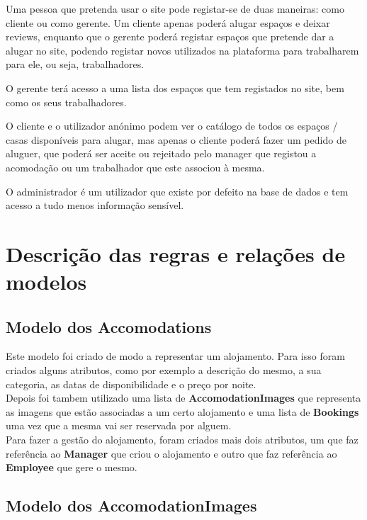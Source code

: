 \documentclass[11pt]{article}
\begin{document}
    Uma pessoa que pretenda usar o site pode registar-se de duas maneiras: como cliente ou como gerente. Um cliente apenas poderá alugar espaços e deixar reviews, enquanto que o gerente poderá registar espaços que pretende dar a alugar no site, podendo registar novos utilizados na plataforma para trabalharem para ele, ou seja, trabalhadores.
    
    O gerente terá acesso a uma lista dos espaços que tem registados no site, bem como os seus trabalhadores.
    
    O cliente e o utilizador anónimo podem ver o catálogo de todos os espaços / casas disponíveis para alugar, mas apenas o cliente poderá fazer um pedido de aluguer, que poderá ser aceite ou rejeitado pelo manager que registou a acomodação ou um trabalhador que este associou à mesma.
    
    O administrador é um utilizador que existe por defeito na base de dados e tem acesso a tudo menos informação sensível.
    

    \large
    \section{Descrição das regras e relações de modelos}
    \normalsize


    \subsection{Modelo dos Accomodations}
    \normalsize
    
    Este modelo foi criado de modo a representar um alojamento. Para isso foram criados alguns atributos, como por exemplo a descrição do mesmo, a sua categoria, as datas de disponibilidade e o preço por noite.\\
    Depois foi tambem utilizado uma lista de \textbf{AccomodationImages} que representa as imagens que estão associadas a um certo alojamento e uma lista de \textbf{Bookings} uma vez que a mesma vai ser reservada por alguem.\\
    Para fazer a gestão do alojamento, foram criados mais dois atributos, um que faz referência ao \textbf{Manager} que criou o alojamento e outro que faz referência ao \textbf{Employee} que gere o mesmo.
    
    
    \subsection{Modelo dos AccomodationImages}
    \normalsize
    
\end{document}
